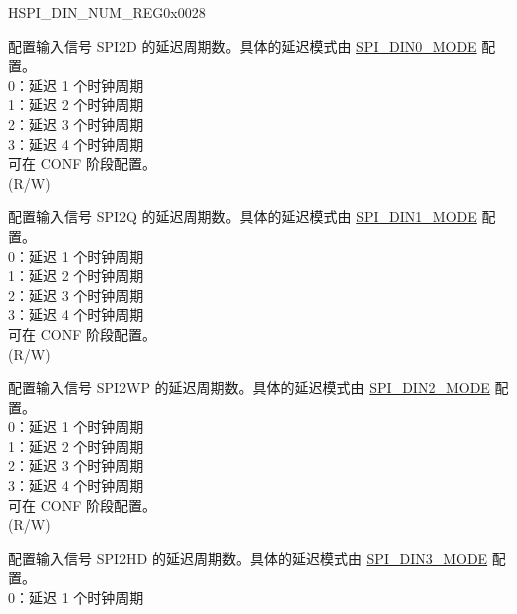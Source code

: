 \begin{register}{H}{SPI\_DIN\_NUM\_REG}{0x0028}\label{regdesc:SPIDINNUMREG}
%
%
%
%
%
%
%
%
%
\regnewline%
\begin{regdesc}\begin{reglist}
\label{fielddesc:SPIDIN0NUM}\item [SPI\_DIN0\_NUM] 配置输入信号 SPI2D 的延迟周期数。具体的延迟模式由 \hyperref[fielddesc:SPIDIN0MODE]{SPI\_DIN0\_MODE} 配置。\\
0：延迟 1 个时钟周期\\
1：延迟 2 个时钟周期\\
2：延迟 3 个时钟周期\\
3：延迟 4 个时钟周期\\
可在 CONF 阶段配置。\\
(R/W)
\label{fielddesc:SPIDIN1NUM}\item [SPI\_DIN1\_NUM] 配置输入信号 SPI2Q 的延迟周期数。具体的延迟模式由 \hyperref[fielddesc:SPIDIN1MODE]{SPI\_DIN1\_MODE} 配置。\\
0：延迟 1 个时钟周期\\
1：延迟 2 个时钟周期\\
2：延迟 3 个时钟周期\\
3：延迟 4 个时钟周期\\
可在 CONF 阶段配置。\\
(R/W)
\label{fielddesc:SPIDIN2NUM}\item [SPI\_DIN2\_NUM] 配置输入信号 SPI2WP 的延迟周期数。具体的延迟模式由 \hyperref[fielddesc:SPIDIN2MODE]{SPI\_DIN2\_MODE} 配置。\\
0：延迟 1 个时钟周期\\
1：延迟 2 个时钟周期\\
2：延迟 3 个时钟周期\\
3：延迟 4 个时钟周期\\
可在 CONF 阶段配置。\\
(R/W)
\label{fielddesc:SPIDIN3NUM}\item [SPI\_DIN3\_NUM] 配置输入信号 SPI2HD 的延迟周期数。具体的延迟模式由 \hyperref[fielddesc:SPIDIN3MODE]{SPI\_DIN3\_MODE} 配置。\\
0：延迟 1 个时钟周期\\

\end{reglist}
\end{regdesc}
\end{register}

